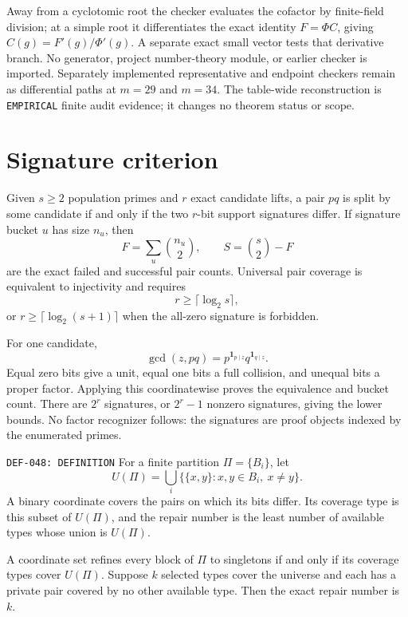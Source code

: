 \documentclass[11pt]{article}
\begin{document}
Away from a cyclotomic root the checker evaluates the cofactor by finite-field
division; at a simple root it differentiates the exact identity
\(F=\Phi C\), giving \(C(g)=F'(g)/\Phi'(g)\).  A separate exact small vector
tests that derivative branch.  No generator, project number-theory module,
or earlier checker is imported.  Separately implemented representative and
endpoint checkers remain as differential paths at \(m=29\) and \(m=34\).
The table-wide reconstruction is \texttt{EMPIRICAL} finite audit evidence;
it changes no theorem status or scope.

\section{Signature criterion}

{}
Given \(s\ge2\) population primes and
\(r\) exact candidate lifts, a pair \(pq\) is split by some candidate if and
only if the two \(r\)-bit support signatures differ.  If signature bucket
\(u\) has size \(n_u\), then
\[
 F=\sum_u\binom{n_u}{2},\qquad
 S=\binom s2-F
\]
are the exact failed and successful pair counts.  Universal pair coverage
is equivalent to injectivity and requires
\[
 r\ge\lceil\log_2s\rceil,
\]
or \(r\ge\lceil\log_2(s+1)\rceil\) when the all-zero signature is forbidden.

\begin{claimproof}
For one candidate,
\[
 \gcd(z,pq)=p^{\mathbf1_{p\mid z}}q^{\mathbf1_{q\mid z}}.
\]
Equal zero bits give a unit, equal one bits a full collision, and unequal
bits a proper factor.  Applying this coordinatewise proves the equivalence
and bucket count.  There are \(2^r\) signatures, or \(2^r-1\) nonzero
signatures, giving the lower bounds.  No factor recognizer follows: the
signatures are proof objects indexed by the enumerated primes.
\end{claimproof}

{\texttt{DEF-048: DEFINITION}}
For a finite partition \(\Pi=\{B_i\}\), let
\[
 U(\Pi)=\bigcup_i\{\{x,y\}:x,y\in B_i,\ x\ne y\}.
\]
A binary coordinate covers the pairs on which its bits differ.  Its
coverage type is this subset of \(U(\Pi)\), and the repair number is the
least number of available types whose union is \(U(\Pi)\).

{}
A coordinate set refines every block of \(\Pi\) to singletons if and only if
its coverage types cover \(U(\Pi)\).  Suppose \(k\) selected types cover the
universe and each has a private pair covered by no other available type.
Then the exact repair number is \(k\).
\end{document}
